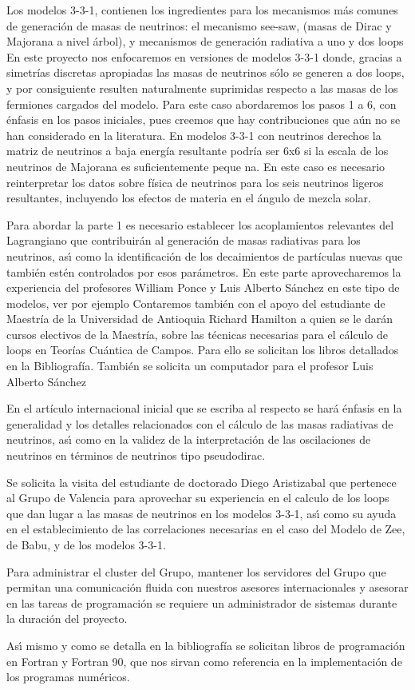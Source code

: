 \begin{ideas}
Los modelos 3-3-1, contienen los ingredientes para los mecanismos más
comunes de generación de masas de neutrinos: el mecanismo see-saw,
(masas de Dirac y Majorana a nivel árbol), y mecanismos de generación
radiativa a uno y dos loops %
En este proyecto nos
enfocaremos en versiones de modelos 3-3-1 donde, gracias a simetrías
discretas apropiadas %
las masas de neutrinos
sólo se generen a dos loops, y por consiguiente resulten naturalmente
suprimidas respecto a las masas de los fermiones cargados del modelo.
Para este caso abordaremos los pasos 1 a 6, con énfasis en los pasos
iniciales, pues creemos que hay contribuciones que aún no se han
considerado en la literatura. En modelos 3-3-1 con neutrinos derechos
la matriz de neutrinos a baja energía resultante podría ser 6x6 si la
escala de los neutrinos de Majorana es suficientemente peque na. En
este caso es necesario reinterpretar los datos sobre física de
neutrinos para los seis neutrinos ligeros resultantes, incluyendo los
efectos de materia en el ángulo de mezcla solar. 

Para abordar la parte 1 es necesario establecer los acoplamientos
relevantes del Lagrangiano que contribuirán al generación de masas
radiativas para los neutrinos, as\'\i{} como la identificación de los
decaimientos de partículas nuevas que también estén controlados
por esos parámetros. En este parte aprovecharemos la experiencia del
profesores William Ponce y Luis Alberto Sánchez en este tipo de
modelos, ver por ejemplo %
Contaremos también con
el apoyo del estudiante de Maestría de la Universidad de
Antioquia Richard Hamilton a quien se le darán cursos electivos de la
Maestría, sobre las técnicas necesarias para el cálculo de loops
en Teorías Cuántica de Campos.  Para ello se solicitan los libros
detallados en la Bibliografía.  También se solicita un computador
para el profesor Luis Alberto Sánchez


En el artículo internacional inicial que se escriba al respecto se
hará énfasis en la generalidad y los detalles relacionados con el
cálculo de las masas radiativas de neutrinos, as\'\i{} como en la validez
de la interpretación de las oscilaciones de neutrinos en términos de
neutrinos tipo pseudodirac.


Se solicita la visita del estudiante de doctorado Diego Aristizabal
que pertenece al Grupo de Valencia para aprovechar su experiencia en
el calculo de los loops que dan lugar a las masas de neutrinos en los
modelos 3-3-1, as\'\i{} como su ayuda en el establecimiento de las
correlaciones necesarias en el caso del Modelo de Zee, de Babu, y de
los modelos 3-3-1.



Para administrar el cluster del Grupo, mantener los servidores del
Grupo que permitan una comunicación fluida con nuestros asesores
internacionales y asesorar en las tareas de programación se requiere
un administrador de sistemas durante la duración del proyecto.

As\'\i{} mismo y como se detalla en la bibliografía se solicitan libros de
programación en Fortran y Fortran 90, que nos sirvan como referencia
en la implementación de los programas numéricos.
\end{ideas}


